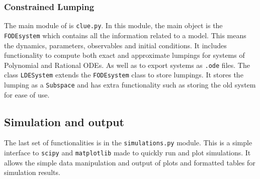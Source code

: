 \subsubsection{Constrained Lumping}
The main module of \ToolName is \texttt{clue.py}.
In this module, the main object is the \texttt{FODEsystem} which contains all the information related to a model.
This means the dynamics, parameters, observables and initial conditions.
It includes functionality to compute both exact and approximate lumpings for systems of Polynomial and Rational ODEs.
As well as to export systems as \texttt{.ode} files.
The class \texttt{LDESystem} extends the \texttt{FODEsystem} class to store lumpings.
It stores the lumping as a \texttt{Subspace} and has extra functionality such as storing the old system for ease of use.

\subsection{Simulation and output}
The last set of functionalities is in the \texttt{simulations.py} module.
This is a simple interface to \texttt{scipy} and \texttt{matplotlib} made to quickly run and plot simulations.
It allows the simple data manipulation and output of plots and formatted tables for simulation results.


